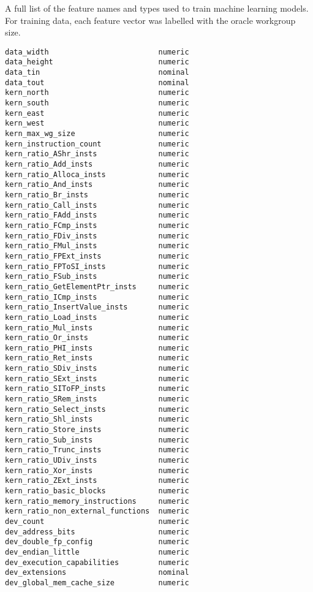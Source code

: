 A full list of the feature names and types used to train machine
learning models. For training data, each feature vector was labelled
with the oracle workgroup size.

\begin{multicols}{2}
\begin{Verbatim}[fontsize=\footnotesize]
data_width                         numeric
data_height                        numeric
data_tin                           nominal
data_tout                          nominal
kern_north                         numeric
kern_south                         numeric
kern_east                          numeric
kern_west                          numeric
kern_max_wg_size                   numeric
kern_instruction_count             numeric
kern_ratio_AShr_insts              numeric
kern_ratio_Add_insts               numeric
kern_ratio_Alloca_insts            numeric
kern_ratio_And_insts               numeric
kern_ratio_Br_insts                numeric
kern_ratio_Call_insts              numeric
kern_ratio_FAdd_insts              numeric
kern_ratio_FCmp_insts              numeric
kern_ratio_FDiv_insts              numeric
kern_ratio_FMul_insts              numeric
kern_ratio_FPExt_insts             numeric
kern_ratio_FPToSI_insts            numeric
kern_ratio_FSub_insts              numeric
kern_ratio_GetElementPtr_insts     numeric
kern_ratio_ICmp_insts              numeric
kern_ratio_InsertValue_insts       numeric
kern_ratio_Load_insts              numeric
kern_ratio_Mul_insts               numeric
kern_ratio_Or_insts                numeric
kern_ratio_PHI_insts               numeric
kern_ratio_Ret_insts               numeric
kern_ratio_SDiv_insts              numeric
kern_ratio_SExt_insts              numeric
kern_ratio_SIToFP_insts            numeric
kern_ratio_SRem_insts              numeric
kern_ratio_Select_insts            numeric
kern_ratio_Shl_insts               numeric
kern_ratio_Store_insts             numeric
kern_ratio_Sub_insts               numeric
kern_ratio_Trunc_insts             numeric
kern_ratio_UDiv_insts              numeric
kern_ratio_Xor_insts               numeric
kern_ratio_ZExt_insts              numeric
kern_ratio_basic_blocks            numeric
kern_ratio_memory_instructions     numeric
kern_ratio_non_external_functions  numeric
dev_count                          numeric
dev_address_bits                   numeric
dev_double_fp_config               numeric
dev_endian_little                  numeric
dev_execution_capabilities         numeric
dev_extensions                     nominal
dev_global_mem_cache_size          numeric

\end{Verbatim}
\end{multicols}
